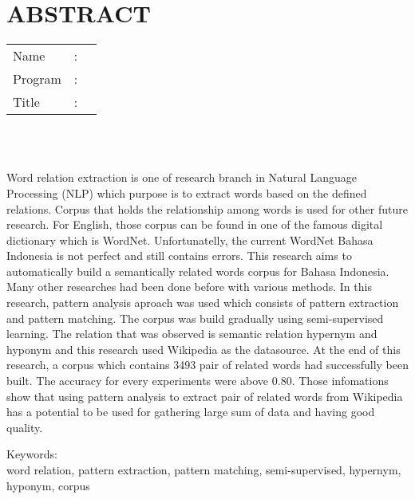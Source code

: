 %
%
%

\chapter*{ABSTRACT}

\vspace*{0.2cm}

\noindent \begin{tabular}{l l p{11.0cm}}
	Name&: & \penulis \\
	Program&: & \programEng \\
	Title&: & \judulInggris \\
\end{tabular} \\ 

\vspace*{0.5cm}

\noindent 
\\ Word relation extraction is one of research branch in Natural Language Processing (NLP) which purpose is to extract words based on the defined relations. Corpus that holds the relationship among words is used for other future research. For English, those corpus can be found in one of the famous digital dictionary which is WordNet. Unfortunatelly, the current WordNet Bahasa Indonesia is not perfect and still contains errors. This research aims to automatically build a semantically related words corpus for Bahasa Indonesia. Many other researches had been done before with various methods. In this research, pattern analysis aproach was used which consists of pattern extraction and pattern matching. The corpus was build gradually using semi-supervised learning. The relation that was observed is semantic relation hypernym and hyponym and this research used Wikipedia as the datasource. At the end of this research, a corpus which contains 3493 pair of related words had successfully been built. The accuracy for every experiments were above 0.80. Those infomations show that using pattern analysis to extract pair of related words from Wikipedia has a potential to be used for gathering large sum of data and having good quality.

\vspace*{0.2cm}

\noindent Keywords: \\ 
\noindent  word relation, pattern extraction, pattern matching, semi-supervised, hypernym, hyponym, corpus \\
\newpage
